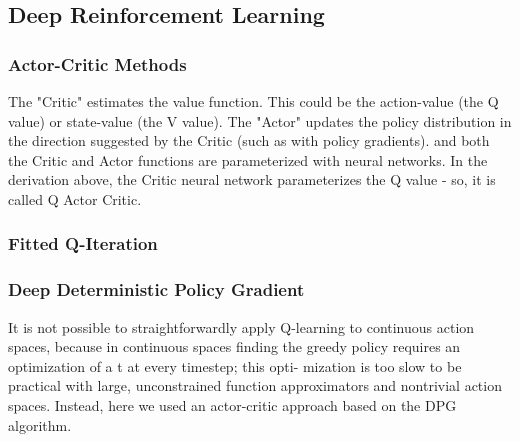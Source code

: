 \subsection{Deep Reinforcement Learning}

\subsubsection{Actor-Critic Methods}
The "Critic" estimates the value function. This could be the action-value (the Q value) or state-value (the V value).
The "Actor" updates the policy distribution in the direction suggested by the Critic (such as with policy gradients).
and both the Critic and Actor functions are parameterized with neural networks. In the derivation above, the Critic neural network parameterizes the Q value - so, it is called Q Actor Critic.
\subsubsection{Fitted Q-Iteration}

\subsubsection{Deep Deterministic Policy Gradient}
It is not possible to straightforwardly apply Q-learning to continuous action spaces, because in continuous spaces finding the greedy policy requires an optimization of a t at every timestep; this opti-
mization is too slow to be practical with large, unconstrained function approximators and nontrivial action spaces. Instead, here we used an actor-critic approach based on the DPG algorithm.
















